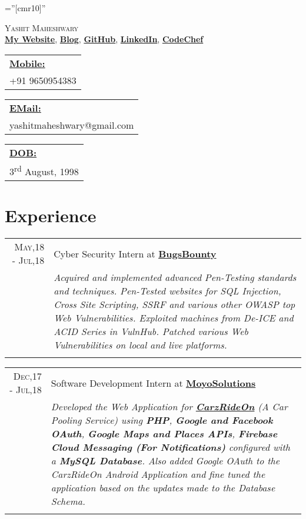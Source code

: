 \documentclass[a4paper,10pt]{article}
\begin{document}
\pagestyle{empty}

\font\fb=''[cmr10]''

\par{\centering
		{\Huge \textsc{Yashit Maheshwary}\\
		}
		\href{https://yashitm.tech/}{\textbf{My Website}}, \href{https://medium.com/@yashitmaheshwary}{\textbf{Blog}}, \href{https://www.github.com/YashitM}{\textbf{GitHub}}, \href{https://www.linkedin.com/in/yashit-maheshwary-aa8078b2/}{\textbf{LinkedIn}}, \href{https://www.codechef.com/users/yashitm}{\textbf{CodeChef}}
	\par}
\begin{tabular}[t]{@{}l} 
    \underline{\textbf{Mobile:}}\\  +91 9650954383
\end{tabular}
\hfill
\begin{tabular}[t]{l@{}}
    \underline{\textbf{EMail:}}\\ yashitmaheshwary@gmail.com
\end{tabular}
\hfill
\begin{tabular}[t]{l@{}}
    \underline{\textbf{DOB:}}\\ 3\textsuperscript{rd} August, 1998
\end{tabular}

\section{Experience}
\begin{tabular}{r|p{14cm}}
\textsc{May,18 - Jul,18} & Cyber Security Intern at \href{https://bugsbounty.io/}{\textbf{BugsBounty}}\\
& \emph{\small{Acquired and implemented advanced Pen-Testing standards and techniques. Pen-Tested websites for SQL Injection, Cross Site Scripting, SSRF and various other OWASP top Web Vulnerabilities. Exploited machines from De-ICE and ACID Series in VulnHub. Patched various Web Vulnerabilities on local and live platforms.}}\\\multicolumn{2}{c}{}
\end{tabular}
\begin{tabular}{r|p{14cm}}
\textsc{Dec,17 - Jul,18} & Software Development Intern at \href{http://www.moyosolutions.online}{\textbf{MoyoSolutions}}\\
& \emph{\small{Developed the Web Application for \href{https://www.carzrideon.com/}{\textbf{CarzRideOn}} (A Car Pooling Service) using \textbf{PHP}, \textbf{Google and Facebook OAuth}, \textbf{Google Maps and Places APIs}, \textbf{Firebase Cloud Messaging (For Notifications)} configured with a \textbf{MySQL Database}. Also added Google OAuth to the CarzRideOn Android Application and fine tuned the application based on the updates made to the Database Schema.}}\\\multicolumn{2}{c}{}
\end{tabular}
\end{document}

